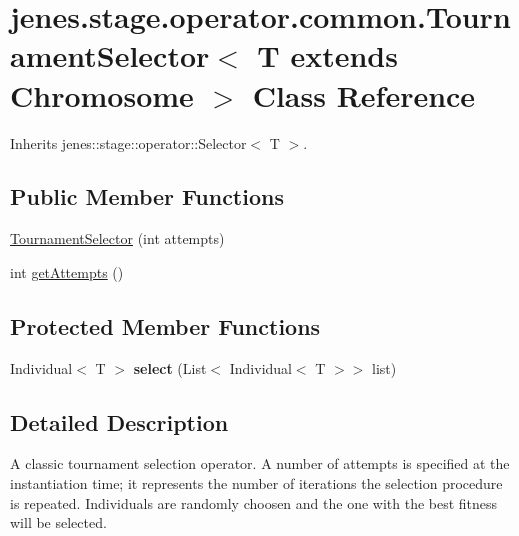 \hypertarget{classjenes_1_1stage_1_1operator_1_1common_1_1_tournament_selector_3_01_t_01extends_01_chromosome_01_4}{
\section{jenes.stage.operator.common.TournamentSelector$<$ T extends Chromosome $>$ Class Reference}
\label{classjenes_1_1stage_1_1operator_1_1common_1_1_tournament_selector_3_01_t_01extends_01_chromosome_01_4}
}
Inherits jenes::stage::operator::Selector$<$ T $>$.

\subsection*{Public Member Functions}
\begin{CompactItemize}
\item 
\hyperlink{classjenes_1_1stage_1_1operator_1_1common_1_1_tournament_selector_3_01_t_01extends_01_chromosome_01_4_69674739689660dc1926b06a43f2aa6d}{TournamentSelector} (int attempts)
\item 
int \hyperlink{classjenes_1_1stage_1_1operator_1_1common_1_1_tournament_selector_3_01_t_01extends_01_chromosome_01_4_93a5d890bc7a8f383bda9791baf0460c}{getAttempts} ()
\end{CompactItemize}
\subsection*{Protected Member Functions}
\begin{CompactItemize}
\item 
\hypertarget{classjenes_1_1stage_1_1operator_1_1common_1_1_tournament_selector_3_01_t_01extends_01_chromosome_01_4_f18e34c3ad12626eb5d8540e05e9877e}{
Individual$<$ T $>$ \textbf{select} (List$<$ Individual$<$ T $>$$>$ list)}
\label{classjenes_1_1stage_1_1operator_1_1common_1_1_tournament_selector_3_01_t_01extends_01_chromosome_01_4_f18e34c3ad12626eb5d8540e05e9877e}

\end{CompactItemize}


\subsection{Detailed Description}
A classic tournament selection operator. A number of attempts is specified at the instantiation time; it represents the number of iterations the selection procedure is repeated. Individuals are randomly choosen and the one with the best fitness will be selected. 

